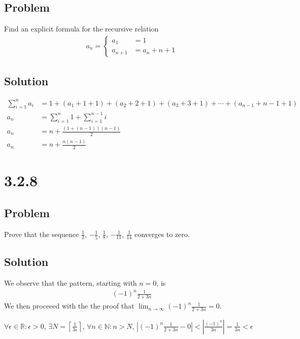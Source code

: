 \documentclass[12pt]{article}
\newcommand{\abs}  [1]{\left|       #1 \right|      }
\newcommand{\ceil} [1]{\left\lceil  #1 \right\rceil }
\newcommand{\R}    [0]{\mathbb{R}                   }
\newcommand{\N}    [0]{\mathbb{N}                   }
\begin{document}
\subsection*{Problem}
Find an explicit formula for the recursive relation
\begin{align*}
    a_n = \begin{cases}
        a_1 &= 1 \\
        a_{n + 1} &= a_n + n + 1
    \end{cases}
\end{align*}

\subsection*{Solution}
\begin{align*}
    \sum_{i = 1}^n a_i &= 1 + (a_1 + 1 + 1) + (a_2 + 2 + 1) + (a_3 + 3 + 1) + \cdots + (a_{n - 1} + n - 1 + 1) \\
    a_n &= \sum_{i = 1}^n 1 + \sum_{i = 1}^{n - 1} i \\
    a_n &= n + \frac{(1 + (n - 1)) (n - 1)}{2} \\
    a_n &= n + \frac{n(n - 1)}{2}
\end{align*}



\section*{3.2.8}

\subsection*{Problem}
Prove that the sequence $\frac{1}{2}$, $-\frac{1}{5}$, $\frac{1}{8}$, $-\frac{1}{11}$, $\frac{1}{14}$ converges to zero.

\subsection*{Solution}
We observe that the pattern, starting with $n = 0$, is
\begin{align*}
    (-1)^n \frac{1}{2 + 3n}
\end{align*}
We then proceeed with the the proof that $\lim_{n \to \infty} (-1)^n \frac{1}{2 + 3n} = 0$.

$\forall \epsilon \in \R : \epsilon > 0$, $\exists N = \ceil{\frac{1}{3 \epsilon}}$, $\forall n \in \N : n > N$, $\abs{(-1)^n \frac{1}{2 + 3n} - 0} < \abs{\frac{(-1)^n}{3n}} = \frac{1}{3n} < \epsilon$
\end{document}
